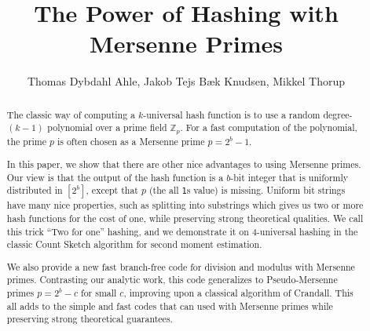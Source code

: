 

\title{The Power of Hashing with Mersenne Primes}
\author{Thomas Dybdahl Ahle, Jakob Tejs B\ae{}k Knudsen, Mikkel Thorup}


\maketitle

\begin{abstract}
The classic way of computing a $k$-universal hash function is to use a random degree-$(k-1)$ polynomial over a prime field $\mathbb Z_p$.
For a fast computation of the polynomial, the prime $p$ is often chosen as a Mersenne prime $p=2^b-1$.

In this paper, we show that there are other nice advantages to using Mersenne primes.
Our view is that the output of the hash function is a $b$-bit integer that is uniformly distributed in $[2^b]$, except that $p$ (the all \texttt1s value) is missing.
Uniform bit strings have many nice properties, such as splitting into substrings which gives us two or more hash functions for the cost of one, while preserving strong theoretical qualities.
We call this trick ``Two for one'' hashing, and we demonstrate it on 4-universal hashing in the classic Count Sketch algorithm for second moment estimation.

We also provide a new fast branch-free code for division and modulus
with Mersenne primes. Contrasting our analytic work, this code
generalizes to Pseudo-Mersenne primes $p=2^b-c$ for small $c$,
improving upon a classical algorithm of Crandall.  This all
adds to the simple and fast codes that can used with Mersenne primes
while preserving strong theoretical guarantees.
\end{abstract}

\setcounter{tocdepth}{2}
\tableofcontents
\newpage







% 











